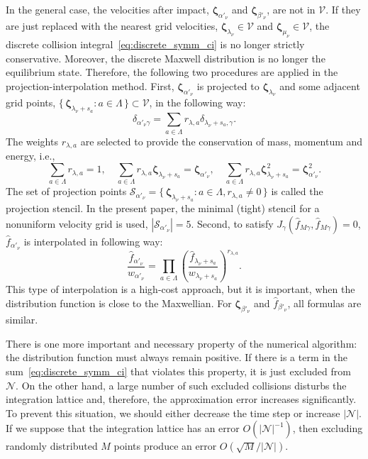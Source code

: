 \documentclass[]{jfm}
\newcommand{\bzeta}{\boldsymbol{\zeta}}
\newcommand{\OO}[1]{O(#1)}
\newcommand{\Set}[2]{\{\,{#1}:{#2}\,\}}
\begin{document}
In the general case, the velocities after impact,
\(\bzeta_{\alpha'_\nu}\) and \(\bzeta_{\beta'_\nu}\), are not in \(\mathcal{V}\).
If they are just replaced with the nearest grid velocities,
\(\bzeta_{\lambda_\nu}\in\mathcal{V}\) and \(\bzeta_{\mu_\nu}\in\mathcal{V}\),
the discrete collision integral~\eqref{eq:discrete_symm_ci} is no longer strictly conservative.
Moreover, the discrete Maxwell distribution is no longer the equilibrium state.
Therefore, the following two procedures are applied in the projection-interpolation method.
First, \(\bzeta_{\alpha'_\nu}\) is projected to \(\bzeta_{\lambda_\nu}\) and
some adjacent grid points, \(\Set{\bzeta_{\lambda_\nu+s_a}}{a\in\Lambda}\subset\mathcal{V}\),
in the following way:
\begin{equation}\label{eq:ci_projection}
    \delta_{\alpha'_\nu\gamma} = \sum_{a\in\Lambda} r_{\lambda,a}\delta_{\lambda_\nu+s_a,\gamma}.
\end{equation}
The weights \(r_{\lambda,a}\) are selected to provide the conservation of mass, momentum and energy, i.e.,
\begin{equation}\label{eq:impact_conservation}
    \sum_{a\in\Lambda} r_{\lambda,a} = 1, \quad
    \sum_{a\in\Lambda} r_{\lambda,a} \bzeta_{\lambda_\nu+s_a} = \bzeta_{\alpha'_\nu}, \quad
    \sum_{a\in\Lambda} r_{\lambda,a} \bzeta_{\lambda_\nu+s_a}^2 = \bzeta_{\alpha'_\nu}^2.
\end{equation}
The set of projection points \(\mathcal{S}_{\alpha'_\nu} = \Set{\bzeta_{\lambda_\nu+s_a}}{a\in\Lambda, r_{\lambda,a}\neq0}\)
is called the projection stencil.
In the present paper, the minimal (tight) stencil for a nonuniform velocity grid is used, \(|\mathcal{S}_{\alpha'_\nu}|=5\).
Second, to satisfy \(J_\gamma(\hat{f}_{M\gamma}, \hat{f}_{M\gamma}) = 0\),
\(\hat{f}_{\alpha'_\nu}\) is interpolated in following way:
\begin{equation}\label{eq:ci_interpolation}
    \frac{\hat{f}_{\alpha'_\nu}}{w_{\alpha'_\nu}} = \prod_{a\in\Lambda}
        \left(\frac{\hat{f}_{\lambda_\nu+s_a}}{w_{\lambda_\nu+s_a}} \right)^{r_{\lambda,a}}.
\end{equation}
This type of interpolation is a high-cost approach, but it is important,
when the distribution function is close to the Maxwellian.
For \(\bzeta_{\beta'_\nu}\) and \(\hat{f}_{\beta'_\nu}\), all formulas are similar.

There is one more important and necessary property of the numerical algorithm:
the distribution function must always remain positive.
If there is a term in the sum~\eqref{eq:discrete_symm_ci} that violates this property,
it is just excluded from \(\mathcal{N}\).
On the other hand, a large number of such excluded collisions disturbs the integration lattice
and, therefore, the approximation error increases significantly.
To prevent this situation, we should either decrease the time step
or increase \(|\mathcal{N}|\).
If we suppose that the integration lattice has an error \(\OO{|\mathcal{N}|^{-1}}\),
then excluding randomly distributed \(M\) points produce an error \(\OO{\sqrt{M}/|\mathcal{N}|}\).
\end{document}
